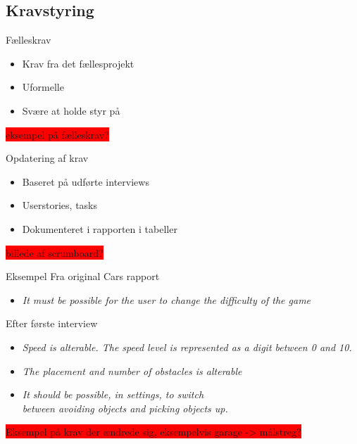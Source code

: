 \subsection{Kravstyring}


\begin{frame}{Fælleskrav}
\begin{itemize}
\item Krav fra det fællesprojekt
\item Uformelle 
\item Svære at holde styr på
\end{itemize}
\colorbox{red}{eksempel på fælleskrav?}
\end{frame}

\begin{frame}{Opdatering af krav}
\begin{itemize}
\item Baseret på udførte interviews
\item Userstories, tasks
\item Dokumenteret i rapporten i tabeller
\end{itemize}
\colorbox{red}{billede af scrumboard?}
\end{frame}

\begin{frame}{Eksempel}
Fra original Cars rapport
\begin{itemize}
\item \textit{It must be possible for the user to change the difficulty of the game}
\end{itemize}

Efter første interview
\begin{itemize}
\item \textit{Speed is alterable. The speed level is represented as a digit between 0 and 10.}
\item \textit{The placement and number of obstacles is alterable}
\item\textit{ It should be possible, in settings, to switch\\ between avoiding objects and picking objects up.}
\end{itemize}
\colorbox{red}{Eksempel på krav der ændrede sig, eksempelvis garage -> målstreg?}
\end{frame}
